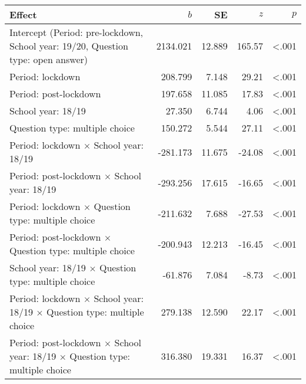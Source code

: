 
\begin{tabular}{lrrrr}
\toprule
Effect & $b$ & SE & $z$ & $p$\\
\midrule
Intercept \small{(Period: pre-lockdown, School year: 19/20, Question type: open answer)} & 2134.021 & 12.889 & 165.57 & <.001\\
Period: lockdown & 208.799 & 7.148 & 29.21 & <.001\\
Period: post-lockdown & 197.658 & 11.085 & 17.83 & <.001\\
School year: 18/19 & 27.350 & 6.744 & 4.06 & <.001\\
Question type: multiple choice & 150.272 & 5.544 & 27.11 & <.001\\
\addlinespace
Period: lockdown $\times$ School year: 18/19 & -281.173 & 11.675 & -24.08 & <.001\\
Period: post-lockdown $\times$ School year: 18/19 & -293.256 & 17.615 & -16.65 & <.001\\
Period: lockdown $\times$ Question type: multiple choice & -211.632 & 7.688 & -27.53 & <.001\\
Period: post-lockdown $\times$ Question type: multiple choice & -200.943 & 12.213 & -16.45 & <.001\\
School year: 18/19 $\times$ Question type: multiple choice & -61.876 & 7.084 & -8.73 & <.001\\
\addlinespace
Period: lockdown $\times$ School year: 18/19 $\times$ Question type: multiple choice & 279.138 & 12.590 & 22.17 & <.001\\
Period: post-lockdown $\times$ School year: 18/19 $\times$ Question type: multiple choice & 316.380 & 19.331 & 16.37 & <.001\\
\bottomrule
\end{tabular}